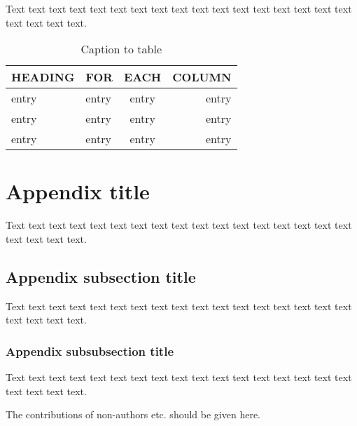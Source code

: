 \documentclass{iucrjournals}
\begin{document}
\begin{enumerate}
Text text text text text text text text text text text text text text
text text text text text text text.


\begin{table}[ht]
\caption{Caption to table \protect\cite{lamport86}} %
\smallskip
\begin{center}
\begin{tabular}{llcr}
\midrule
 HEADING    & FOR        & EACH       & COLUMN     \\
\midrule
 entry      & entry      & entry      & entry      \\
 entry      & entry      & entry      & entry      \\
 entry      & entry      & entry      & entry      \\
\end{tabular}
\end{center}
\end{table}


\appendix %
\section{Appendix title}

Text text text text text text text text text text text text text text
text text text text text text text.

\subsection{Appendix subsection title}

Text text text text text text text text text text text text text text
text text text text text text text.

\subsubsection{Appendix subsubsection title}

Text text text text text text text text text text text text text text
text text text text text text text.

\end{enumerate}

\begin{acknowledgements}
The contributions of non-authors etc. should be given here.
\end{acknowledgements}





\end{document}
